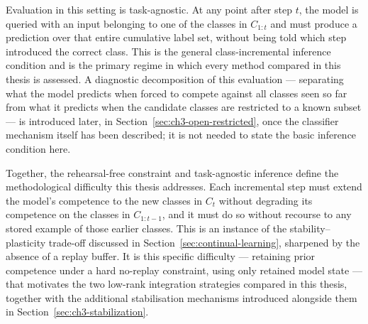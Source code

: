 Evaluation in this setting is task-agnostic. At any point after step $t$,
the model is queried with an input belonging to one of the classes in
$C_{1:t}$ and must produce a prediction over that entire cumulative label
set, without being told which step introduced the correct class. This is
the general class-incremental inference condition and is the primary
regime in which every method compared in this thesis is assessed. A
diagnostic decomposition of this evaluation --- separating what the model
predicts when forced to compete against all classes seen so far from what
it predicts when the candidate classes are restricted to a known subset ---
is introduced later, in Section~\ref{sec:ch3-open-restricted}, once the classifier mechanism itself
has been described; it is not needed to state the basic inference
condition here.

Together, the rehearsal-free constraint and task-agnostic inference define
the methodological difficulty this thesis addresses. Each incremental step
must extend the model's competence to the new classes in $C_t$ without
degrading its competence on the classes in $C_{1:t-1}$, and it must do so
without recourse to any stored example of those earlier classes. This is
an instance of the stability--plasticity trade-off discussed in Section~\ref{sec:continual-learning},
sharpened by the absence of a replay buffer. It is this specific
difficulty --- retaining prior competence under a hard no-replay constraint,
using only retained model state --- that motivates
the two low-rank integration strategies compared in this thesis, together
with the additional stabilisation mechanisms introduced alongside them in
Section~\ref{sec:ch3-stabilization}.

